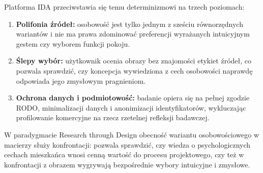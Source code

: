 Platforma IDA przeciwstawia się temu determinizmowi na trzech poziomach:
\begin{enumerate}
  \item \textbf{Polifonia źródeł:} osobowość jest tylko jednym z sześciu równorzędnych wariantów i nie ma prawa zdominować preferencji wyrażanych intuicyjnym gestem czy wyborem funkcji pokoju.
  \item \textbf{Ślepy wybór:} użytkownik ocenia obrazy bez znajomości etykiet źródeł, co pozwala sprawdzić, czy koncepcja wywiedziona z cech osobowości naprawdę odpowiada jego zmysłowym pragnieniom.
  \item \textbf{Ochrona danych i podmiotowość:} badanie opiera się na pełnej zgodzie RODO, minimalizacji danych i anonimizacji identyfikatorów, wykluczając profilowanie komercyjne na rzecz rzetelnej refleksji badawczej.
\end{enumerate}

W paradygmacie Research through Design obecność wariantu osobowościowego w macierzy służy konfrontacji: pozwala sprawdzić, czy wiedza o psychologicznych cechach mieszkańca wnosi cenną wartość do procesu projektowego, czy też w konfrontacji z obrazem wygrywają bezpośrednie wybory intuicyjne i zmysłowe.

